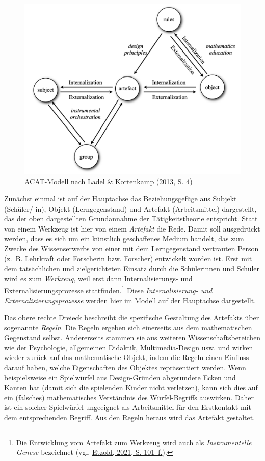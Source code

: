 \documentclass[
]{scrbook}
\theoremstyle{definition}
\theoremstyle{definition}
\theoremstyle{definition}
\theoremstyle{definition}
\theoremstyle{remark}
\begin{document}
\begin{figure}

{\centering \includegraphics[width=0.75\linewidth]{pictures/7-ACAT} 

}

\caption{ACAT-Modell nach Ladel \& Kortenkamp (\protect\hyperlink{ref-Ladel2013}{2013, S. 4})}\label{fig:ACAT}
\end{figure}

Zunächst einmal ist auf der Hauptachse das Beziehungsgefüge aus Subjekt (Schüler/-in), Objekt (Lerngegenstand) und Artefakt (Arbeitsmittel) dargestellt, das der oben dargestellten Grundannahme der Tätigkeitstheorie entspricht.
Statt von einem Werkzeug ist hier von einem \emph{Artefakt} die Rede. Damit soll ausgedrückt werden, dass es sich um ein künstlich geschaffenes Medium handelt, das zum Zwecke des Wissenserwerbs von einer mit dem Lerngegenstand vertrauten Person (z.~B. Lehrkraft oder Forscherin bzw. Forscher) entwickelt worden ist. Erst mit dem tatsächlichen und zielgerichteten Einsatz durch die Schülerinnen und Schüler wird es zum \emph{Werkzeug}, weil erst dann Internalisierungs- und Externalisierungsprozesse stattfinden.\footnote{Die Entwicklung vom Artefakt zum Werkzeug wird auch als \emph{Instrumentelle Genese} bezeichnet (vgl. \protect\hyperlink{ref-Etzold2021}{Etzold, 2021, S. 101~f.}).} Diese \emph{Internalisierung- und Externalisierungsprozesse} werden hier im Modell auf der Hauptachse dargestellt.

Das obere rechte Dreieck beschreibt die spezifische Gestaltung des Artefakts über sogenannte \emph{Regeln}. Die Regeln ergeben sich einerseits aus dem mathematischen Gegenstand selbst. Andererseits stammen sie aus weiteren Wissenschaftsbereichen wie der Psychologie, allgemeinen Didaktik, Multimedia-Design usw. und wirken wieder zurück auf das mathematische Objekt, indem die Regeln einen Einfluss darauf haben, welche Eigenschaften des Objektes repräsentiert werden. Wenn beispielsweise ein Spielwürfel aus Design-Gründen abgerundete Ecken und Kanten hat (damit sich die spielenden Kinder nicht verletzen), kann sich dies auf ein (falsches) mathematisches Verständnis des Würfel-Begriffs auswirken. Daher ist ein solcher Spielwürfel ungeeignet als Arbeitsmittel für den Erstkontakt mit dem entsprechenden Begriff. Aus den Regeln heraus wird das Artefakt gestaltet.
\end{document}
